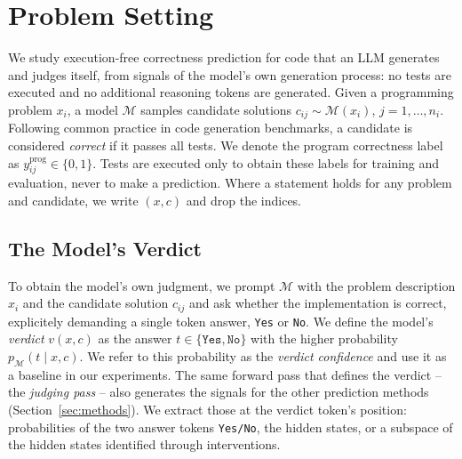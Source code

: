 \section{Problem Setting}
\label{sec:problem}
We study execution-free correctness prediction for code that an LLM generates
and judges itself, from signals of the model's own generation process: no tests are
executed and no additional reasoning tokens are generated. Given a programming
problem $x_i$, a model $\mathcal{M}$ samples candidate solutions
$c_{ij} \sim \mathcal{M}(x_i)$, $j = 1, \dots, n_i$. Following common practice in code generation benchmarks, a candidate is
considered \emph{correct} if it passes all tests. We denote the program correctness label as $y^{\mathrm{prog}}_{ij} \in \{0,1\}$.
Tests are executed only to obtain these labels for training and evaluation,
never to make a prediction. Where a statement holds for any problem and
candidate, we write $(x, c)$ and drop the indices.

\subsection{The Model's Verdict} %
\label{sec:problem-verdict}
To obtain the model's own judgment, we prompt $\mathcal{M}$ with the problem description $x_i$ and the candidate solution $c_{ij}$
and ask whether the implementation is correct, explicitely demanding a single token answer, \texttt{Yes} or \texttt{No}. We define the model's \emph{verdict} $v(x, c)$ as the
answer $t \in \{\texttt{Yes}, \texttt{No}\}$ with the higher probability
$p_{\mathcal{M}}(t {\mid} x, c)$. We refer to this probability as the {\it verdict confidence} and use it as a baseline in our experiments. The same forward pass that defines the verdict -- the \emph{judging
pass} --
 also generates the signals for the other prediction methods (Section~\ref{sec:methods}). We extract those at the verdict token's position: 
probabilities of the two answer tokens {\tt Yes/No}, the hidden states, or a subspace of
the hidden states identified through interventions. 

